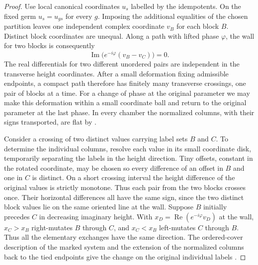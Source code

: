 \begin{proof}
Use local canonical coordinates $u_s$ labelled by the idempotents. On the fixed germ $u_s=u_{gs}$ for every $g$. Imposing the additional equalities of the chosen partition leaves one independent complex coordinate $v_B$ for each block $B$. Distinct block coordinates are unequal. Along a path with lifted phase $\varphi$, the wall for two blocks is consequently
\[
             \operatorname{Im}\bigl(e^{-i\varphi}(v_B-v_C)\bigr)=0 .
\]
The real differentials for two different unordered pairs are independent in the transverse height coordinates. After a small deformation fixing admissible endpoints, a compact path therefore has finitely many transverse crossings, one pair of blocks at a time. For a change of phase at the original parameter we may make this deformation within a small coordinate ball and return to the original parameter at the last phase. In every chamber the normalized columns, with their signs transported, are flat by \cite[Proposition~2.5.1]{GGI}.

Consider a crossing of two distinct values carrying label sets $B$ and $C$. To determine the individual columns, resolve each value in its small coordinate disk, temporarily separating the labels in the height direction. Tiny offsets, constant in the rotated coordinate, may be chosen so every difference of an offset in $B$ and one in $C$ is distinct. On a short crossing interval the height difference of the original values is strictly monotone. Thus each pair from the two blocks crosses once. Their horizontal differences all have the same sign, since the two distinct block values lie on the same oriented line at the wall. Suppose $B$ initially precedes $C$ in decreasing imaginary height. With $x_D=\operatorname{Re}(e^{-i\varphi}v_D)$ at the wall, $x_C>x_B$ right-mutates $B$ through $C$, and $x_C<x_B$ left-mutates $C$ through $B$. Thus all the elementary exchanges have the same direction. The ordered-cover description of the marked system and the extension of the normalized columns back to the tied endpoints give the change on the original individual labels \cite[Propositions~2.5.1, 4.3.4 and 4.3.8]{GGI}.


\end{proof}
